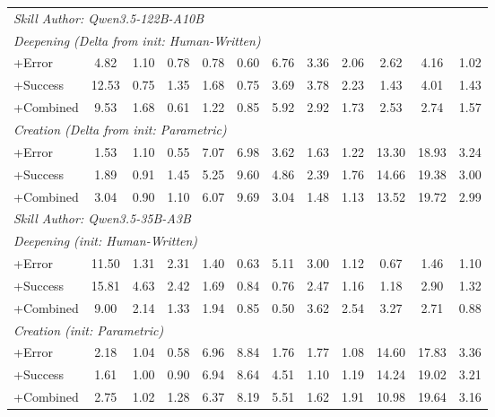 \begin{table}[t]
{\begin{tabular}{@{}l ccccc ccccc c@{}}
\midrule
\multicolumn{12}{l}{\textit{Skill Author: Qwen3.5-122B-A10B}} \\[2pt]
\multicolumn{12}{l}{\quad\textit{Deepening (Delta from init: Human-Written)}} \\
\quad\quad +Error
    & 4.82 & 1.10 & 0.78 & 0.78 & 0.60 & 6.76 & 3.36 & 2.06 & 2.62 & 4.16 & 1.02 \\
\quad\quad +Success
    & 12.53 & 0.75 & 1.35 & 1.68 & 0.75 & 3.69 & 3.78 & 2.23 & 1.43 & 4.01 & 1.43 \\
\quad\quad +Combined
    & 9.53 & 1.68 & 0.61 & 1.22 & 0.85 & 5.92 & 2.92 & 1.73 & 2.53 & 2.74 & 1.57 \\[2pt]
\multicolumn{12}{l}{\quad\textit{Creation (Delta from init: Parametric)}} \\
\quad\quad +Error
    & 1.53 & 1.10 & 0.55 & 7.07 & 6.98 & 3.62 & 1.63 & 1.22 & 13.30 & 18.93 & 3.24 \\
\quad\quad +Success
    & 1.89 & 0.91 & 1.45 & 5.25 & 9.60 & 4.86 & 2.39 & 1.76 & 14.66 & 19.38 & 3.00 \\
\quad\quad +Combined
    & 3.04 & 0.90 & 1.10 & 6.07 & 9.69 & 3.04 & 1.48 & 1.13 & 13.52 & 19.72 & 2.99 \\[2pt]
\midrule
\multicolumn{12}{l}{\textit{Skill Author: Qwen3.5-35B-A3B}} \\[2pt]
\multicolumn{12}{l}{\quad\textit{Deepening (init: Human-Written)}} \\
\quad\quad +Error
    & 11.50 & 1.31 & 2.31 & 1.40 & 0.63 & 5.11 & 3.00 & 1.12 & 0.67 & 1.46 & 1.10 \\
\quad\quad +Success
    & 15.81 & 4.63 & 2.42 & 1.69 & 0.84 & 0.76 & 2.47 & 1.16 & 1.18 & 2.90 & 1.32 \\
\quad\quad +Combined
    & 9.00 & 2.14 & 1.33 & 1.94 & 0.85 & 0.50 & 3.62 & 2.54 & 3.27 & 2.71 & 0.88 \\[2pt]
\multicolumn{12}{l}{\quad\textit{Creation (init: Parametric)}} \\
\quad\quad +Error
    & 2.18 & 1.04 & 0.58 & 6.96 & 8.84 & 1.76 & 1.77 & 1.08 & 14.60 & 17.83 & 3.36 \\
\quad\quad +Success
    & 1.61 & 1.00 & 0.90 & 6.94 & 8.64 & 4.51 & 1.10 & 1.19 & 14.24 & 19.02 & 3.21 \\
\quad\quad +Combined
    & 2.75 & 1.02 & 1.28 & 6.37 & 8.19 & 5.51 & 1.62 & 1.91 & 10.98 & 19.64 & 3.16 \\[2pt]
\bottomrule
\end{tabular}
}%
\end{table}
